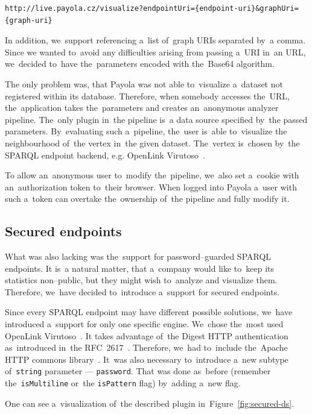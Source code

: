 {  \scriptsize
\begin{verbatim}
http://live.payola.cz/visualize?endpointUri={endpoint-uri}&graphUri={graph-uri}
\end{verbatim}
}

In addition, we~support referencing a~list of~graph URIs separated by~a comma. Since 
we wanted to~avoid any difficulties arising from passing a~URI in~an 
URL, we~decided to~have the~parameters encoded with the~Base64 algorithm.

The only problem was, that Payola was not able to~visualize a~dataset not registered
within its database. Therefore, when somebody accesses the~URL, the~application takes the~parameters and creates an~anonymous analyzer 
pipeline. The~only plugin in~the pipeline is~a data source specified by~the 
passed parameters. By~evaluating such a~pipeline, the~user is~able to~visualize 
the neighbourhood of~the vertex in~the given dataset. The~vertex is~chosen by~the 
SPARQL endpoint backend, e.g. OpenLink Virutoso~\cite{virtuoso}.

To allow an~anonymous user to~modify the~pipeline, we~also set a~cookie with an~authorization token to~their browser. When logged into  
Payola a~user with such a~token can overtake the~ownership of~the pipeline and 
fully modify it.

\subsection{Secured endpoints}
What was also lacking was the~support for password--guarded SPARQL endpoints. 
It is~a natural matter, that a~company would like to~keep its statistics 
non--public, but they might wish to~analyze and visualize them. Therefore, we~have decided to~introduce a~support for secured endpoints.

Since every SPARQL endpoint may have different possible solutions, we~have 
introduced a~support for only one specific engine. We~chose the~most
used OpenLink Virutoso~\cite{virtuoso}.
It takes advantage of~the Digest HTTP authentication as~introduced in~the 
RFC~2617~\cite{rfc-2617}. Therefore, we~had to~include the~Apache HTTP commons 
library~\cite{apache-http-commons}. It~was also necessary to~introduce a~new 
subtype of~\texttt{string} parameter --- \texttt{password}. That was done as~before (remember the~\texttt{isMultiline} or~the \texttt{isPattern} flag) by~adding a~new flag.

One can see a~visualization of~the described plugin in~Figure~\ref{fig:secured-ds}. 

